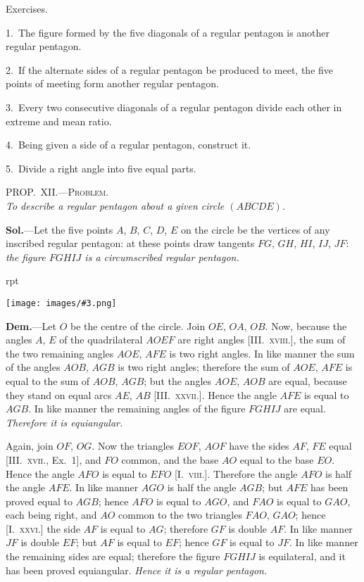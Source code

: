 \documentclass[oneside]{book}
\newcounter{wrapwidth}
\newcommand\myprop[2]{
\bigskip\Needspace*{4\baselineskip}\begin{center}\textsc{#1}\\\medskip\emph{#2}\par\end{center}
}
\newcommand\exhead[1]{
\Needspace*{5\baselineskip}\begin{center}
\textsf{#1}
\end{center}
}
\newcommand\imgflow[3]{
\setcounter{wrapwidth}{#1}
\begin{wrapfigure}[#2]{r}{\value{wrapwidth}pt}
\begin{center}
\vspace{-0.3in}
\texttt{[image: images/\#3.png]}
\end{center}
\end{wrapfigure}
}
\begin{document}
\exhead{Exercises.}

\begin{footnotesize}
1.~The figure formed by the five diagonals of a regular pentagon
is another regular pentagon.

2.~If the alternate sides of a regular pentagon be produced to
meet, the five points of meeting form another regular pentagon.

3.~Every two consecutive diagonals of a regular pentagon
divide each other in extreme and mean ratio.

4.~Being given a side of a regular pentagon, construct it.

5.~Divide a right angle into five equal parts.
\par\end{footnotesize}

\myprop{PROP\@.~XII\@.---Problem.}{To describe a regular pentagon about a given circle $(ABCDE)$.}

\textbf{Sol.}---Let the five points $A$, $B$, $C$, $D$, $E$ on the circle
be the vertices of any inscribed regular pentagon: at
these points draw tangents $FG$, $GH$, $HI$, $IJ$, $JF$: \emph{the
figure $FGHIJ$ is a circumscribed regular pentagon.}

\imgflow{140}{12}{f164}

\textbf{Dem.}---Let $O$ be the centre of the circle. Join $OE$,
$OA$, $OB$. Now, because the
angles $A$, $E$ of the quadrilateral
$AOEF$ are right angles
[III\@.~\textsc{xviii.}], the sum of the
two remaining angles $AOE$,
$AFE$ is two right angles. In
like manner the sum of the
angles $AOB$, $AGB$ is two
right angles; therefore the
sum of $AOE$, $AFE$ is equal
to the sum of $AOB$, $AGB$;
but the angles $AOE$, $AOB$ are equal, because they
stand on equal arcs $AE$, $AB$ [III\@.~\textsc{xxvii.}]. Hence the
angle $AFE$ is equal to $AGB$. In like manner the
remaining angles of the figure $FGHIJ$ are equal.
\emph{Therefore it is equiangular.}

Again, join $OF$, $OG$. Now the triangles $EOF$, $AOF$
have the sides $AF$, $FE$ equal [III\@.~\textsc{xvii.}, Ex.~1], and $FO$
common, and the base $AO$ equal to the base $EO$. Hence
the angle $AFO$ is equal to $EFO$ [I.~\textsc{viii.}]. Therefore
the angle $AFO$ is half the angle $AFE$. In like manner
$AGO$ is half the angle $AGB$; but $AFE$ has been
proved equal to $AGB$; hence $AFO$ is equal to $AGO$,
and $FAO$ is equal to $GAO$, each being right, and $AO$
common to the two triangles $FAO$, $GAO$; hence
[I.~\textsc{xxvi.}] the side $AF$ is equal to $AG$; therefore $GF$ is
double $AF$. In like manner $JF$ is double $EF$; but $AF$
is equal to $EF$; hence $GF$ is equal to $JF$. In like
manner the remaining sides are equal; therefore the
figure $FGHIJ$ is equilateral, and it has been proved
equiangular. \emph{Hence it is a regular pentagon.}\par\smallskip
\end{document}
